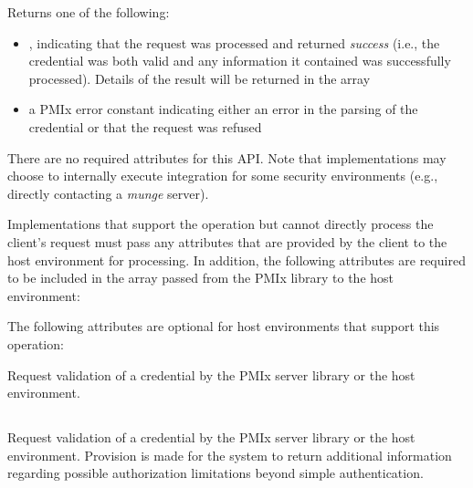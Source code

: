 Returns one of the following:

\begin{itemize}
    \item {}, indicating that the request was processed and returned \textit{success} (i.e., the credential was both valid and any information it contained was successfully processed). Details of the result will be returned in the  array
    \item a PMIx error constant indicating either an error in the parsing of the credential or that the request was refused
\end{itemize}

\reqattrstart
There are no required attributes for this \ac{API}. Note that implementations may choose to internally
execute integration for some security environments (e.g., directly
contacting a \textit{munge} server).

Implementations that support the operation but cannot directly process the client's request must pass any attributes that are provided by the client to the host environment for processing. In addition, the following attributes are required to be included in the  array passed from the \ac{PMIx} library to the host environment:


\reqattrend

\optattrstart
The following attributes are optional for host environments that support this operation:


\optattrend

\descr

Request validation of a credential by the \ac{PMIx} server library or the host environment.


\subsection{}

\summary

Request validation of a credential by the \ac{PMIx} server library or the host environment. Provision is made for the system to return additional information regarding possible authorization limitations beyond simple authentication.

